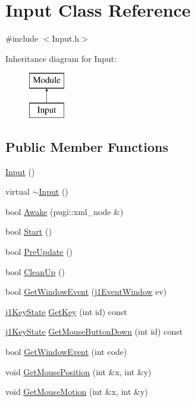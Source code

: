 \hypertarget{class_input}{}\section{Input Class Reference}
\label{class_input}


{\ttfamily \#include $<$Input.\+h$>$}

Inheritance diagram for Input\+:\begin{figure}[H]
\begin{center}
\leavevmode
\includegraphics[height=2.000000cm]{class_input}
\end{center}
\end{figure}
\subsection*{Public Member Functions}
\begin{DoxyCompactItemize}
\item 
\mbox{\hyperlink{class_input_abae3f379d3f157cf42dc857309832dba}{Input}} ()
\item 
virtual \mbox{\hyperlink{class_input_af2db35ba67c8a8ccd23bef6a482fc291}{$\sim$\+Input}} ()
\item 
bool \mbox{\hyperlink{class_input_a9876d33805a73bbb895eb453f5c492ec}{Awake}} (pugi\+::xml\+\_\+node \&)
\item 
bool \mbox{\hyperlink{class_input_a8519ba5884a6ea0d3ef332788ee248a8}{Start}} ()
\item 
bool \mbox{\hyperlink{class_input_a850eff60334f4057e5cb579892d7cf06}{Pre\+Update}} ()
\item 
bool \mbox{\hyperlink{class_input_a6cad2fca1092afa12ae299dcc4fe7c49}{Clean\+Up}} ()
\item 
bool \mbox{\hyperlink{class_input_a410e4f80cd2a071f64ba0d4e390a42c3}{Get\+Window\+Event}} (\mbox{\hyperlink{_input_8h_ade7d5388bd52daf006714bf2d6aefec8}{j1\+Event\+Window}} ev)
\item 
\mbox{\hyperlink{_input_8h_aea34d794e9a93d93622f3600b7eaf229}{j1\+Key\+State}} \mbox{\hyperlink{class_input_abfcdffdbed22511d1b8d6535132c6990}{Get\+Key}} (int id) const
\item 
\mbox{\hyperlink{_input_8h_aea34d794e9a93d93622f3600b7eaf229}{j1\+Key\+State}} \mbox{\hyperlink{class_input_a966ec0abafd0ed1a773bfb468d4cd6b7}{Get\+Mouse\+Button\+Down}} (int id) const
\item 
bool \mbox{\hyperlink{class_input_a2f346a6ad84265739c82f78f9aa2ed1d}{Get\+Window\+Event}} (int code)
\item 
void \mbox{\hyperlink{class_input_af5d3fbb97233343b2b9ecfd20a1d443a}{Get\+Mouse\+Position}} (int \&x, int \&y)
\item 
void \mbox{\hyperlink{class_input_a512e16dd27914b0ac71210ed3d452cb1}{Get\+Mouse\+Motion}} (int \&x, int \&y)
\end{DoxyCompactItemize}
